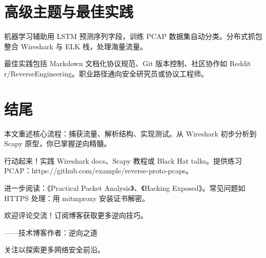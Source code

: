 \chapter{高级主题与最佳实践}
机器学习辅助用 LSTM 预测序列字段，训练 PCAP 数据集自动分类。分布式抓包整合 Wireshark 与 ELK 栈，处理海量流量。\par
最佳实践包括 Markdown 文档化协议规范、Git 版本控制、社区协作如 Reddit r/ReverseEngineering。职业路径通向安全研究员或协议工程师。\par
\chapter{结尾}
本文重述核心流程：捕获流量、解析结构、实现测试。从 Wireshark 初步分析到 Scapy 原型，你已掌握逆向精髓。\par
行动起来！实践 Wireshark docs、Scapy 教程或 Black Hat talks。提供练习 PCAP：https://github.com/example/reverse-proto-pcaps。\par
进一步阅读：《Practical Packet Analysis》、《Hacking Exposed》。常见问题如 HTTPS 处理：用 mitmproxy 安装证书解密。\par
欢迎评论交流！订阅博客获取更多逆向技巧。\par
——技术博客作者：逆向之道\par
关注以探索更多网络安全前沿。\par
